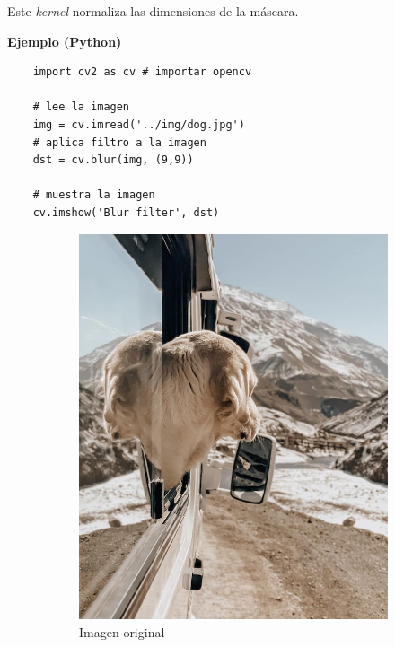 \documentclass[a4paper, 12pt]{article}
\begin{document}
Este \emph{kernel} normaliza las dimensiones de la máscara.

\textbf{Ejemplo (Python)}
\begin{lstlisting}
    import cv2 as cv # importar opencv

    # lee la imagen
    img = cv.imread('../img/dog.jpg')
    # aplica filtro a la imagen
    dst = cv.blur(img, (9,9))

    # muestra la imagen
    cv.imshow('Blur filter', dst)
\end{lstlisting}

\begin{figure}[!ht]
    \centering
    \begin{subfigure}{0.4\textwidth}
        \includegraphics[width=\textwidth]{img/dog.jpg}
        \caption{Imagen original}
    \end{subfigure}
    \begin{subfigure}{0.4\textwidth}

\end{subfigure}
\end{figure}
\end{document}
